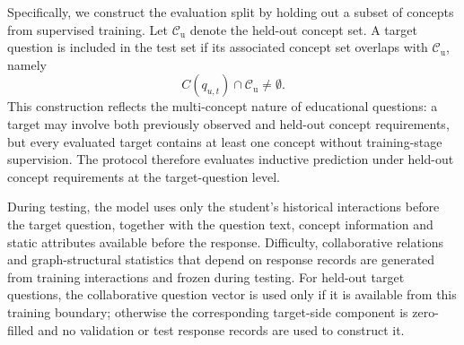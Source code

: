 \documentclass[a4paper,12pt]{article}
\numberwithin{table}{section}
\begin{document}
Specifically, we construct the evaluation split by holding out a subset of concepts from supervised training. Let \(\mathcal{C}_{\mathrm{u}}\) denote the held-out concept set. A target question is included in the test set if its associated concept set overlaps with \(\mathcal{C}_{\mathrm{u}}\), namely \[C(q_{u,t})\cap\mathcal{C}_{\mathrm{u}}\neq\emptyset .\] This construction reflects the multi-concept nature of educational questions: a target may involve both previously observed and held-out concept requirements, but every evaluated target contains at least one concept without training-stage supervision. The protocol therefore evaluates inductive prediction under held-out concept requirements at the target-question level.

During testing, the model uses only the student's historical interactions before the target question, together with the question text, concept information and static attributes available before the response. Difficulty, collaborative relations and graph-structural statistics that depend on response records are generated from training interactions and frozen during testing. For held-out target questions, the collaborative question vector is used only if it is available from this training boundary; otherwise the corresponding target-side component is zero-filled and no validation or test response records are used to construct it.

\begin{table}[H]
\centering
\small
\caption{Split statistics for unseen-concept knowledge tracing evaluation}
\label{tab:cold-start-split-statistics}
\end{table}
\end{document}
